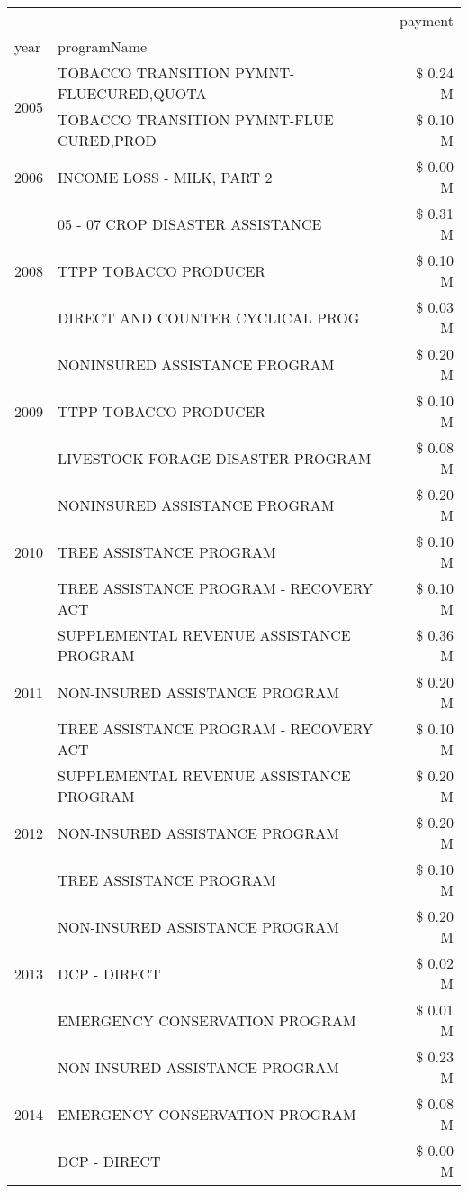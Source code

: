 \begin{tabular}{llr}
\toprule
 &  & payment \\
year & programName &  \\
\midrule
\multirow[t]{2}{*}{2005} & TOBACCO TRANSITION PYMNT-FLUECURED,QUOTA & \$ 0.24 M \\
 & TOBACCO TRANSITION PYMNT-FLUE CURED,PROD & \$ 0.10 M \\
\cline{1-3}
2006 & INCOME LOSS - MILK, PART 2 & \$ 0.00 M \\
\cline{1-3}
\multirow[t]{3}{*}{2008} & 05 - 07 CROP DISASTER ASSISTANCE & \$ 0.31 M \\
 & TTPP TOBACCO PRODUCER & \$ 0.10 M \\
 & DIRECT AND COUNTER CYCLICAL PROG & \$ 0.03 M \\
\cline{1-3}
\multirow[t]{3}{*}{2009} & NONINSURED ASSISTANCE PROGRAM & \$ 0.20 M \\
 & TTPP TOBACCO PRODUCER & \$ 0.10 M \\
 & LIVESTOCK FORAGE DISASTER  PROGRAM & \$ 0.08 M \\
\cline{1-3}
\multirow[t]{3}{*}{2010} & NONINSURED ASSISTANCE PROGRAM & \$ 0.20 M \\
 & TREE ASSISTANCE PROGRAM & \$ 0.10 M \\
 & TREE ASSISTANCE PROGRAM - RECOVERY ACT & \$ 0.10 M \\
\cline{1-3}
\multirow[t]{3}{*}{2011} & SUPPLEMENTAL REVENUE ASSISTANCE PROGRAM & \$ 0.36 M \\
 & NON-INSURED ASSISTANCE PROGRAM & \$ 0.20 M \\
 & TREE ASSISTANCE PROGRAM - RECOVERY ACT & \$ 0.10 M \\
\cline{1-3}
\multirow[t]{3}{*}{2012} & SUPPLEMENTAL REVENUE ASSISTANCE PROGRAM & \$ 0.20 M \\
 & NON-INSURED ASSISTANCE PROGRAM & \$ 0.20 M \\
 & TREE ASSISTANCE PROGRAM & \$ 0.10 M \\
\cline{1-3}
\multirow[t]{3}{*}{2013} & NON-INSURED ASSISTANCE PROGRAM & \$ 0.20 M \\
 & DCP - DIRECT & \$ 0.02 M \\
 & EMERGENCY CONSERVATION PROGRAM & \$ 0.01 M \\
\cline{1-3}
\multirow[t]{3}{*}{2014} & NON-INSURED ASSISTANCE PROGRAM & \$ 0.23 M \\
 & EMERGENCY CONSERVATION PROGRAM & \$ 0.08 M \\
 & DCP - DIRECT & \$ 0.00 M \\

\end{tabular}
